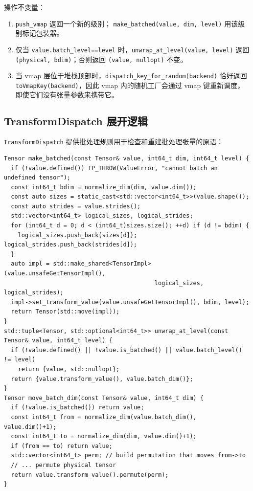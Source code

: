 操作不变量：
\begin{enumerate}[leftmargin=1.2em]
\item \texttt{push\_vmap} 返回一个新的级别； \texttt{make\_batched(value, dim, level)} 用该级别标记包装器。
\item 仅当 \texttt{value.batch\_level==level} 时，\texttt{unwrap\_at\_level(value, level)} 返回 \texttt{(physical, bdim)}；否则返回 \texttt{(value, nullopt)} 不变。
\item 当 vmap 层位于堆栈顶部时，\texttt{dispatch\_key\_for\_random(backend)} 恰好返回 \texttt{toVmapKey(backend)}，因此 vmap 内的随机工厂会通过 vmap 键重新调度，即使它们没有张量参数来携带它。
\end{enumerate}

\subsection{TransformDispatch 展开逻辑}
\label{sec:unwrap}

\texttt{TransformDispatch} 提供批处理规则用于检查和重建批处理张量的原语：

\begin{lstlisting}[caption={make and unwrap.}, label=lst:makeunwrap]
Tensor make_batched(const Tensor& value, int64_t dim, int64_t level) {
  if (!value.defined()) TP_THROW(ValueError, "cannot batch an undefined tensor");
  const int64_t bdim = normalize_dim(dim, value.dim());
  const auto sizes = static_cast<std::vector<int64_t>>(value.shape());
  const auto strides = value.strides();
  std::vector<int64_t> logical_sizes, logical_strides;
  for (int64_t d = 0; d < (int64_t)sizes.size(); ++d) if (d != bdim) {
    logical_sizes.push_back(sizes[d]); logical_strides.push_back(strides[d]);
  }
  auto impl = std::make_shared<TensorImpl>(value.unsafeGetTensorImpl(),
                                           logical_sizes, logical_strides);
  impl->set_transform_value(value.unsafeGetTensorImpl(), bdim, level);
  return Tensor(std::move(impl));
}
std::tuple<Tensor, std::optional<int64_t>> unwrap_at_level(const Tensor& value, int64_t level) {
  if (!value.defined() || !value.is_batched() || value.batch_level() != level)
    return {value, std::nullopt};
  return {value.transform_value(), value.batch_dim()};
}
Tensor move_batch_dim(const Tensor& value, int64_t dim) {
  if (!value.is_batched()) return value;
  const int64_t from = normalize_dim(value.batch_dim(), value.dim()+1);
  const int64_t to = normalize_dim(dim, value.dim()+1);
  if (from == to) return value;
  std::vector<int64_t> perm; // build permutation that moves from->to
  // ... permute physical tensor
  return value.transform_value().permute(perm);
}
\end{lstlisting}

